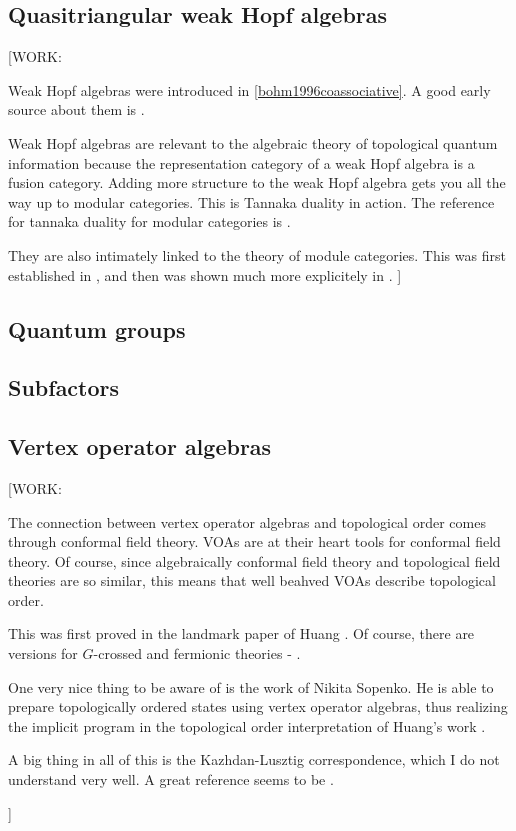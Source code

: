 \subsection{Quasitriangular weak Hopf algebras}

[WORK:

Weak Hopf algebras were introduced in \ref{bohm1996coassociative}. A good early source about them is \cite{nikshych2004semisimple}.

Weak Hopf algebras are relevant to the algebraic theory of topological quantum information because the representation category of a weak Hopf algebra is a fusion category. Adding more structure to the weak Hopf algebra gets you all the way up to modular categories. This is Tannaka duality in action. The reference for tannaka duality for modular categories is \cite{pfeiffer2009tannaka}.

They are also intimately linked to the theory of module categories. This was first established in \cite{ostrik2003module}, and then was shown much more explicitely in \cite{kitaev2012models}.
]

\subsection{Quantum groups}

\subsection{Subfactors}

\subsection{Vertex operator algebras}

[WORK:

The connection between vertex operator algebras and topological order comes through conformal field theory. VOAs are at their heart tools for conformal field theory. Of course, since algebraically conformal field theory and topological field theories are so similar, this means that well beahved VOAs describe topological order.

This was first proved in the landmark paper of Huang \cite{huang2005vertex}. Of course, there are versions for $G$-crossed and fermionic theories - \cite{huang2021representation, carpi2023vertex}.

One very nice thing to be aware of is the work of Nikita Sopenko. He is able to prepare topologically ordered states using vertex operator algebras, thus realizing the implicit program in the topological order interpretation of Huang's work \cite{sopenko2023topological}.

A big thing in all of this is the Kazhdan-Lusztig correspondence, which I do not understand very well. A great reference seems to be \cite{tan2020vertex}.

]